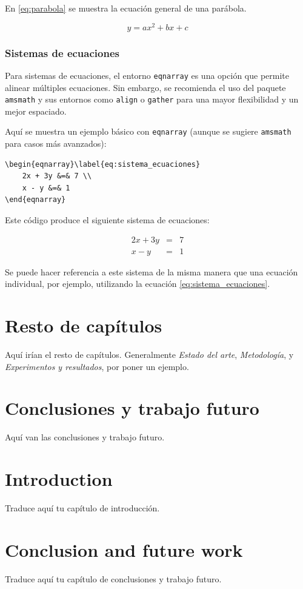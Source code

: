 \documentclass[11pt,a4paper]{book}
\begin{document}
En \eqref{eq:parabola} se muestra la ecuación general de una parábola.

\begin{equation}\label{eq:parabola}
    y = ax^2 + bx + c
\end{equation}

\subsection{Sistemas de ecuaciones}
Para sistemas de ecuaciones, el entorno \texttt{eqnarray} es una opción que permite alinear múltiples ecuaciones. Sin embargo, se recomienda el uso del paquete \texttt{amsmath} y sus entornos como \texttt{align} o \texttt{gather} para una mayor flexibilidad y un mejor espaciado.

Aquí se muestra un ejemplo básico con \texttt{eqnarray} (aunque se sugiere \texttt{amsmath} para casos más avanzados):

\begin{verbatim}
\begin{eqnarray}\label{eq:sistema_ecuaciones}
    2x + 3y &=& 7 \\
    x - y &=& 1
\end{eqnarray}
\end{verbatim}

Este código produce el siguiente sistema de ecuaciones:

\begin{eqnarray}\label{eq:sistema_ecuaciones}
    2x + 3y &=& 7 \\
    x - y &=& 1
\end{eqnarray}

Se puede hacer referencia a este sistema de la misma manera que una ecuación individual, por ejemplo, utilizando la ecuación \eqref{eq:sistema_ecuaciones}.

\chapter{Resto de capítulos}
Aquí irían el resto de capítulos. Generalmente \emph{Estado del arte}, \emph{Metodología}, y \emph{Experimentos y resultados}, por poner un ejemplo.

\chapter{Conclusiones y trabajo futuro}
Aquí van las conclusiones y trabajo futuro.

\chapter{Introduction}
Traduce aquí tu capítulo de introducción.

\chapter{Conclusion and future work}
Traduce aquí tu capítulo de conclusiones y trabajo futuro.



\printglossary[type=\acronymtype, title={Acrónimos}]
\end{document}
